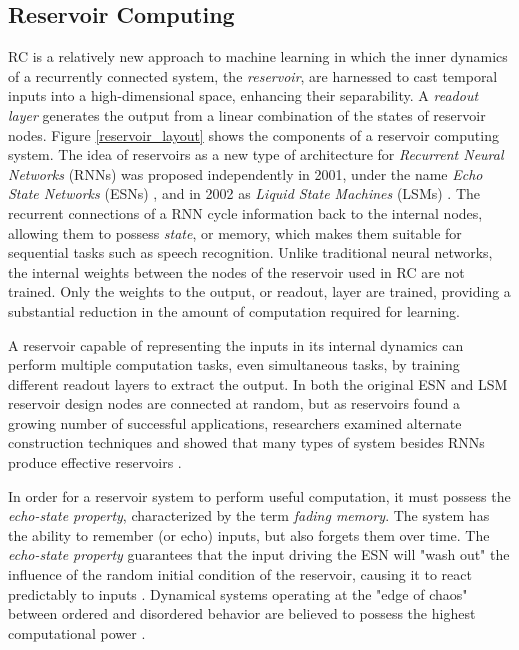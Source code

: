 \documentclass{elsarticle}
\begin{document}
\begin{multicols}{2}
\subsection{Reservoir Computing}
 RC is a relatively new approach to machine learning in which  the inner 
    dynamics of a recurrently connected system, the \textit{reservoir}, are 
    harnessed to cast temporal inputs into a high-dimensional space, enhancing 
    their separability.  A \textit{readout layer} generates the output from a 
    linear combination of the states of reservoir nodes.  Figure 
    \ref{reservoir_layout} shows the components of a reservoir computing 
    system.  The idea of reservoirs as a new type of architecture for 
    \textit{Recurrent Neural Networks} (RNNs) was proposed independently in 
    2001, under the name \textit{Echo State Networks} (ESNs) 
    \cite{jaeger2001echo}, and in 2002 as \textit{Liquid State Machines} (LSMs) 
    \cite{maass2002real}.  The recurrent connections of a RNN cycle information 
    back to the internal nodes, allowing them to possess \textit{state}, or 
    memory, which makes them suitable for sequential tasks such as speech 
    recognition. Unlike traditional neural networks, the internal weights 
    between the nodes of the reservoir used in RC are not trained.  Only the 
    weights to the output, or readout, layer are trained, providing a 
    substantial reduction in the amount of computation required for learning.  
    \par  A reservoir capable of representing the inputs in its internal 
    dynamics can perform multiple computation tasks, even simultaneous tasks, 
             by training different readout layers to extract the output. In 
                both the original ESN and LSM reservoir design
nodes are connected at random, but as reservoirs found a growing number of 
successful applications, researchers examined alternate construction techniques 
\cite{lukovsevicius2007overview} and showed that many types of system besides 
RNNs produce effective reservoirs \cite{tanaka2018recent}.\par
    In order for a reservoir system to perform useful computation, it must 
    possess the \textit{echo-state property}, characterized by the term 
    \textit{fading memory}.  The system has the ability to remember (or echo) 
    inputs, but also forgets them over time. The \textit{echo-state property} 
    guarantees that the input driving the ESN will "wash out" the influence of 
    the random initial condition of the reservoir, causing it to react 
    predictably to inputs \cite{jaeger2001echo}. Dynamical systems operating at 
    the "edge of chaos" between ordered and disordered behavior are believed  
    to possess the highest computational power 
    \cite{langton1990computation}\cite{legenstein2007edge}.


\end{multicols}
\end{document}
